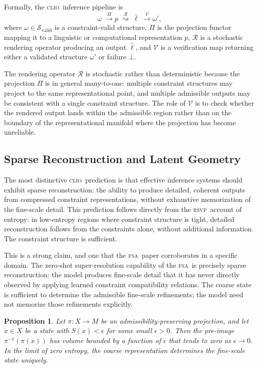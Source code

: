 \documentclass[11pt,a4paper]{article}
\theoremstyle{plain}
\newtheorem{proposition}[theorem]{Proposition}
\theoremstyle{definition}
\theoremstyle{remark}
\newcommand{\Svalid}{\mathcal{S}_{\mathrm{valid}}}
\newcommand{\RSVP}{\textup{\textsc{rsvp}}}
\newcommand{\CLIO}{\textup{\textsc{clio}}}
\newcommand{\FSA}{\textup{\textsc{fsa}}}
\begin{document}
Formally, the \CLIO\ inference pipeline is
\[
\omega \;\xrightarrow{\;\Pi\;} p \;\overset{\mathcal{R}}{\rightsquigarrow}\;
\hat{\ell} \;\xrightarrow{\;\mathcal{V}\;} \omega',
\]
where $\omega \in \Svalid$ is a constraint-valid structure, $\Pi$ is the
projection functor mapping it to a linguistic or computational
representation $p$, $\mathcal{R}$ is a stochastic rendering operator
producing an output $\hat{\ell}$, and $\mathcal{V}$ is a verification
map returning either a validated structure $\omega'$ or failure $\bot$.

The rendering operator $\mathcal{R}$ is stochastic rather than deterministic
because the projection $\Pi$ is in general many-to-one: multiple constraint
structures may project to the same representational point, and multiple
admissible outputs may be consistent with a single constraint structure.
The role of $\mathcal{V}$ is to check whether the rendered output lands
within the admissible region rather than on the boundary of the
representational manifold where the projection has become unreliable.

\subsection{Sparse Reconstruction and Latent Geometry}

The most distinctive \CLIO\ prediction is that effective inference systems
should exhibit sparse reconstruction: the ability to produce detailed,
coherent outputs from compressed constraint representations, without
exhaustive memorization of the fine-scale detail. This prediction follows
directly from the \RSVP\ account of entropy: in low-entropy regions where
constraint structure is tight, detailed reconstruction follows from the
constraints alone, without additional information. The constraint structure
is sufficient.

This is a strong claim, and one that the \FSA\ paper corroborates in a
specific domain. The zero-shot super-resolution capability of the \FSA\ is
precisely sparse reconstruction: the model produces fine-scale detail that
it has never directly observed by applying learned constraint compatibility
relations. The coarse state is sufficient to determine the admissible
fine-scale refinements; the model need not memorize those refinements
explicitly.

\begin{proposition}
\label{prop:sparse}
Let $\pi: X \to M$ be an admissibility-preserving projection, and let $x \in X$
be a state with $S(x) < \epsilon$ for some small $\epsilon > 0$. Then the
pre-image $\pi^{-1}(\pi(x))$ has volume bounded by a function of $\epsilon$
that tends to zero as $\epsilon \to 0$. In the limit of zero entropy,
the coarse representation determines the fine-scale state uniquely.
\end{proposition}
\end{document}
